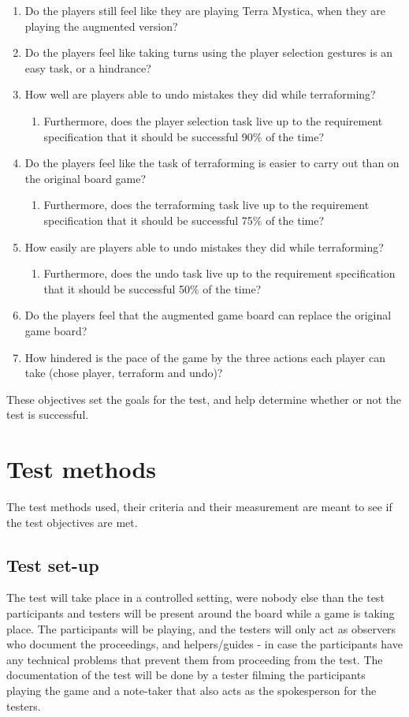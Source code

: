 \begin{enumerate}
\item Do the players still feel like they are playing Terra Mystica, when they are playing the augmented version? 
\item Do the players feel like taking turns using the player selection gestures is an easy task, or a hindrance?
\item How well are players able to undo mistakes they did while terraforming?
\begin{enumerate}
\item Furthermore, does the player selection task live up to the requirement specification that it should be successful 90\% of the time?
\end{enumerate}
\item Do the players feel like the task of terraforming is easier to carry out than on the original board game?
\begin{enumerate}
\item Furthermore, does the terraforming task live up to the requirement specification that it should be successful 75\% of the time?
\end{enumerate}
\item How easily are players able to undo mistakes they did while terraforming?
\begin{enumerate}
\item Furthermore, does the undo task live up to the requirement specification that it should be successful 50\% of the time?
\end{enumerate}
\item Do the players feel that the augmented game board can replace the original game board?
\item How hindered is the pace of the game by the three actions each player can take (chose player, terraform and undo)?
\end{enumerate}

These objectives set the goals for the test, and help determine whether or not the test is successful. 

\section{Test methods}
The test methods used, their criteria and their measurement are meant to see if the test objectives are met.

\subsection{Test set-up}
The test will take place in a controlled setting, were nobody else than the test participants and testers will be present around the board while a game is taking place. The participants will be playing, and the testers will only act as observers who document the proceedings, and helpers/guides - in case the participants have any technical problems that prevent them from proceeding from the test.
The documentation of the test will be done by a tester filming the participants playing the game and a note-taker that also acts as the spokesperson for the testers.

